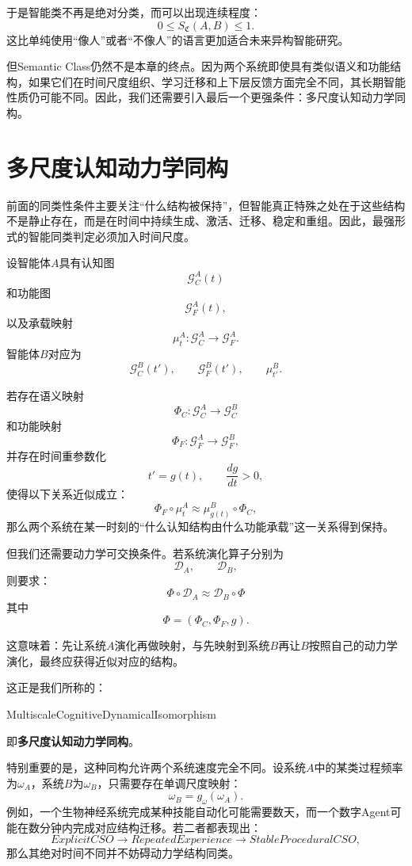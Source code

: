 于是智能类不再是绝对分类，而可以出现连续程度：
\[
0
\le
S_{\mathfrak C}(A,B)
\le
1.
\]
这比单纯使用``像人''或者``不像人''的语言更加适合未来异构智能研究。

但Semantic Class仍然不是本章的终点。因为两个系统即使具有类似语义和功能结构，如果它们在时间尺度组织、学习迁移和上下层反馈方面完全不同，其长期智能性质仍可能不同。因此，我们还需要引入最后一个更强条件：多尺度认知动力学同构。

\section{多尺度认知动力学同构}

前面的同类性条件主要关注``什么结构被保持''，但智能真正特殊之处在于这些结构不是静止存在，而是在时间中持续生成、激活、迁移、稳定和重组。因此，最强形式的智能同类判定必须加入时间尺度。

设智能体$A$具有认知图
\[
\mathcal G_C^A(t)
\]
和功能图
\[
\mathcal G_F^A(t),
\]
以及承载映射
\[
\mu_t^A:
\mathcal G_C^A
\rightarrow
\mathcal G_F^A.
\]
智能体$B$对应为
\[
\mathcal G_C^B(t'),
\qquad
\mathcal G_F^B(t'),
\qquad
\mu_{t'}^B.
\]

若存在语义映射
\[
\Phi_C:
\mathcal G_C^A
\rightarrow
\mathcal G_C^B
\]
和功能映射
\[
\Phi_F:
\mathcal G_F^A
\rightarrow
\mathcal G_F^B,
\]
并存在时间重参数化
\[
t'=g(t),
\qquad
\frac{dg}{dt}>0,
\]
使得以下关系近似成立：
\[
\Phi_F\circ\mu_t^A
\approx
\mu_{g(t)}^B\circ\Phi_C,
\]
那么两个系统在某一时刻的``什么认知结构由什么功能承载''这一关系得到保持。

但我们还需要动力学可交换条件。若系统演化算子分别为
\[
\mathcal D_A,
\qquad
\mathcal D_B,
\]
则要求：
\[
\boxed{
\Phi
\circ
\mathcal D_A
\approx
\mathcal D_B
\circ
\Phi
}
\]
其中
\[
\Phi=
(\Phi_C,\Phi_F,g).
\]

这意味着：先让系统$A$演化再做映射，与先映射到系统$B$再让$B$按照自己的动力学演化，最终应获得近似对应的结构。

这正是我们所称的：
\begin{statementbox}
MultiscaleCognitiveDynamicalIsomorphism
\end{statementbox}
即\textbf{多尺度认知动力学同构}。

特别重要的是，这种同构允许两个系统速度完全不同。设系统$A$中的某类过程频率为$\omega_A$，系统$B$为$\omega_B$，只需要存在单调尺度映射：
\[
\omega_B
=
g_\omega(\omega_A).
\]
例如，一个生物神经系统完成某种技能自动化可能需要数天，而一个数字Agent可能在数分钟内完成对应结构迁移。若二者都表现出：
\[
ExplicitCSO
\rightarrow
RepeatedExperience
\rightarrow
StableProceduralCSO,
\]
那么其绝对时间不同并不妨碍动力学结构同类。


